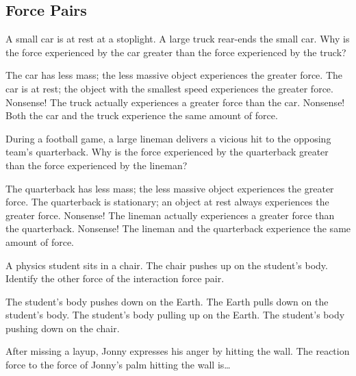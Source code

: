 \documentclass[]{exam}
\begin{document}
\clearpage

\subsection*{Force Pairs}

\begin{questions}
\question
A small car is at rest at a stoplight. A large truck rear-ends the small car. Why is the force experienced by the car greater than the force experienced by the truck?

\begin{randomizechoices}
    \choice The car has less mass; the less massive object experiences the greater force.
    \choice The car is at rest; the object with the smallest speed experiences the greater force.
    \choice Nonsense! The truck actually experiences a greater force than the car.
    \correctchoice Nonsense! Both the car and the truck experience the same amount of force.    
\end{randomizechoices}

\question
During a football game, a large lineman delivers a vicious hit to the opposing team’s quarterback. Why is the force experienced by the quarterback greater than the force experienced by the lineman?

\begin{randomizechoices}
    \choice The quarterback has less mass; the less massive object experiences the greater force.
    \choice The quarterback is stationary; an object at rest always experiences the greater force.
    \choice Nonsense! The lineman actually experiences a greater force than the quarterback.
    \correctchoice Nonsense! The lineman and the quarterback experience the same amount of force.    
\end{randomizechoices}

\question
A physics student sits in a chair. The chair pushes up on the student's body. Identify the other force of the interaction force pair.

\begin{randomizechoices}
    \choice The student's body pushes down on the Earth.
    \choice The Earth pulls down on the student's body.
    \choice The student's body pulling up on the Earth.
    \correctchoice The student's body pushing down on the chair.    
\end{randomizechoices}

\question
After missing a layup, Jonny expresses his anger by hitting the wall.  The reaction force to the force of Jonny's palm hitting the wall is\dots 


\end{questions}
\end{document}
